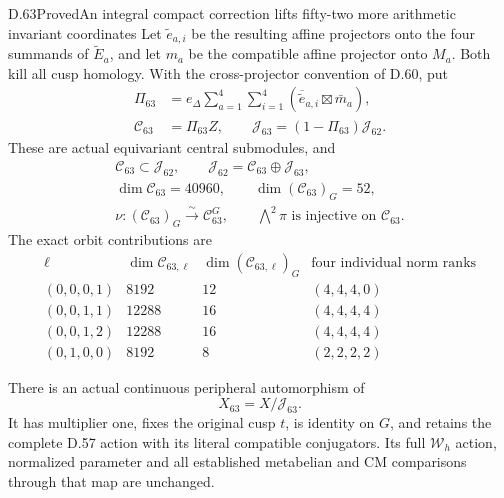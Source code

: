 \begin{statement}{D.63}{Proved}{An integral compact correction lifts fifty-two more arithmetic invariant coordinates}
Let \(\widetilde e_{a,i}\) be the resulting affine
projectors onto the four summands of
\(\widetilde E_a\), and let \(m_a\) be the compatible
affine projector onto \(M_a\). Both kill all cusp
homology. With the cross-projector convention of D.60,
put
\[
 \begin{aligned}
 \Pi_{63}&=e_\Delta\sum_{a=1}^4\sum_{i=1}^4
                   (\overline{\widetilde e}_{a,i}\boxtimes\bar m_a),\\
 \mathcal C_{63}&=\Pi_{63}Z,\qquad
 \mathcal J_{63}=(1-\Pi_{63})\mathcal J_{62}.
 \end{aligned}
 \tag{D.63.3}
\]
These are actual equivariant central submodules, and
\[
 \begin{gathered}
 \mathcal C_{63}\subset\mathcal J_{62},\qquad
 \mathcal J_{62}=\mathcal C_{63}\oplus\mathcal J_{63},\\
 \dim\mathcal C_{63}=40960,\qquad
 \dim(\mathcal C_{63})_G=52,\\
 \nu:(\mathcal C_{63})_G\xrightarrow{\ \sim\ }\mathcal C_{63}^G,
 \qquad \bigwedge^2\pi\text{ is injective on }\mathcal C_{63}.
 \end{gathered}
 \tag{D.63.4}
\]
The exact orbit contributions are
\[
 \begin{array}{c|r|r|c}
 \ell&\dim\mathcal C_{63,\ell}&\dim(\mathcal C_{63,\ell})_G
     &\text{four individual norm ranks}\\\hline
 (0,0,0,1)&8192&12&(4,4,4,0)\\
 (0,0,1,1)&12288&16&(4,4,4,4)\\
 (0,0,1,2)&12288&16&(4,4,4,4)\\
 (0,1,0,0)&8192&8&(2,2,2,2)
 \end{array}
 \tag{D.63.5}
\]

There is an actual continuous peripheral automorphism of
\[
                         X_{63}=X/\mathcal J_{63}.
 \tag{D.63.6}
\]
It has multiplier one, fixes the original cusp \(t\),
is identity on \(G\), and retains the complete D.57
action with its literal compatible conjugators.
Its full \(\mathcal W_h\) action, normalized parameter
and all established metabelian and CM comparisons
through that map are unchanged.


\end{statement}
